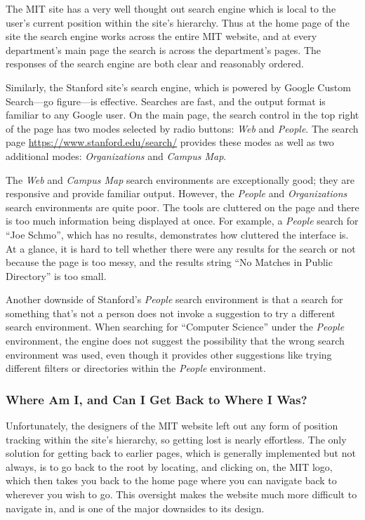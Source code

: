 The MIT site has a very well thought out search engine which is local to the user's current
position within the site's hierarchy. Thus at the home page of the site the search engine
works across the entire MIT website, and at every department's main page the search is
across the department's pages. The responses of the search engine are both clear and
reasonably ordered.

Similarly, the Stanford site's search engine, which is powered by Google Custom
Search---go figure---is effective. Searches are fast, and the output format is
familiar to any Google user. On the main page, the search control in the top right
of the page has two modes selected by radio buttons: \textsl{Web} and \textsl{People}.
The search page \url{https://www.stanford.edu/search/} provides these modes as well
as two additional modes: \textsl{Organizations} and \textsl{Campus Map}.

The \textsl{Web} and \textsl{Campus Map} search environments are exceptionally good;
they are responsive and provide familiar output. However, the \textsl{People} and
\textsl{Organizations} search environments are quite poor. The tools are
cluttered on the page and there is too much information being displayed at once.
For example, a \textsl{People} search for ``Joe Schmo'', which has no results,
demonstrates how cluttered the interface is. At a glance, it is hard to tell
whether there were any results for the search or not because the page is too
messy, and the results string ``No Matches in Public Directory'' is too small.

Another downside of Stanford's \textsl{People} search environment is that a search
for something that's not a person does not invoke a suggestion to try a different
search environment. When searching for ``Computer Science'' under the \textsl{People}
environment, the engine does not suggest the possibility that the wrong search
environment was used, even though it provides other suggestions like trying
different filters or directories within the \textsl{People} environment.

\subsubsection*{Where Am I, and Can I Get Back to Where I Was?}

Unfortunately, the designers of the MIT website left out any form of position tracking within
the site's hierarchy, so getting lost is nearly effortless. The only solution for getting back
to earlier pages, which is generally implemented but not always, is to go back to the root by
locating, and clicking on, the MIT logo, which then takes you back to the home page where you
can navigate back to wherever you wish to go. This oversight makes the website much more
difficult to navigate in, and is one of the major downsides to its design.

